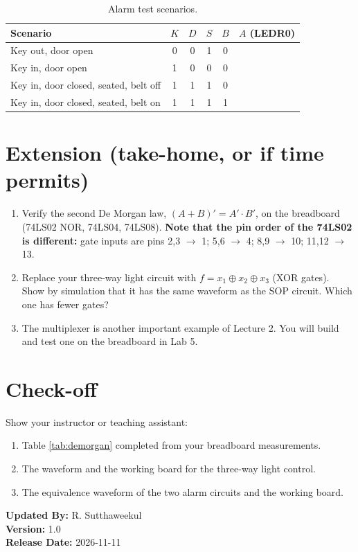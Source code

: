 \documentclass{article}
\begin{document}
\begin{table}[H]
    \centering
    \begin{tabular}{|l|c|c|c|c|c|}
        \hline
        \textbf{Scenario} & $K$ & $D$ & $S$ & $B$ & $A$ (LEDR0) \\
        \hline
        Key out, door open & 0 & 0 & 1 & 0 & \\
        Key in, door open & 1 & 0 & 0 & 0 & \\
        Key in, door closed, seated, belt off & 1 & 1 & 1 & 0 & \\
        Key in, door closed, seated, belt on & 1 & 1 & 1 & 1 & \\
        \hline
    \end{tabular}
    \caption{Alarm test scenarios.}
    \label{tab:alarm}
\end{table}

\section*{Extension (take-home, or if time permits)}
\begin{enumerate}
    \item Verify the second De Morgan law, $(A+B)' = A'\cdot B'$, on the breadboard (74LS02 NOR, 74LS04, 74LS08). \textbf{Note that the pin order of the 74LS02 is different:} gate inputs are pins 2,3 $\rightarrow$ 1; 5,6 $\rightarrow$ 4; 8,9 $\rightarrow$ 10; 11,12 $\rightarrow$ 13.
    \item Replace your three-way light circuit with $f = x_1 \oplus x_2 \oplus x_3$ (XOR gates). Show by simulation that it has the same waveform as the SOP circuit. Which one has fewer gates?
    \item The multiplexer is another important example of Lecture 2. You will build and test one on the breadboard in Lab 5.
\end{enumerate}

\section*{Check-off}
Show your instructor or teaching assistant:
\begin{enumerate}
    \item Table \ref{tab:demorgan} completed from your breadboard measurements.
    \item The waveform and the working board for the three-way light control.
    \item The equivalence waveform of the two alarm circuits and the working board.
\end{enumerate}

\vspace{1cm}
\noindent \textbf{Updated By:} R. Sutthaweekul \\
\textbf{Version:} 1.0 \\
\textbf{Release Date:} 2026-11-11
\end{document}
